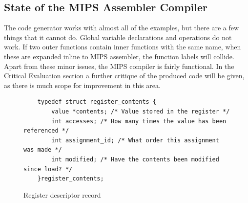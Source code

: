 \subsection{State of the MIPS Assembler Compiler}
The code generator works with almost all of the examples, but there are a few things that it cannot do. Global variable declarations and operations do not work. If two outer functions contain inner functions with the same name, when these are expanded inline to MIPS assembler, the function labels will collide. Apart from these minor issues, the MIPS compiler is fairly functional. In the Critical Evaluation section a further critique of the produced code will be given, as there is much scope for improvement in this area.

\begin{figure}[p]
	\begin{verbatim}
	typedef struct register_contents {
	    value *contents; /* Value stored in the register */
	    int accesses; /* How many times the value has been referenced */
	    int assignment_id; /* What order this assignment was made */
	    int modified; /* Have the contents been modified since load? */
	}register_contents;
	\end{verbatim}
	\caption{Register descriptor record}
	\label{fig:descriptor}
\end{figure}

